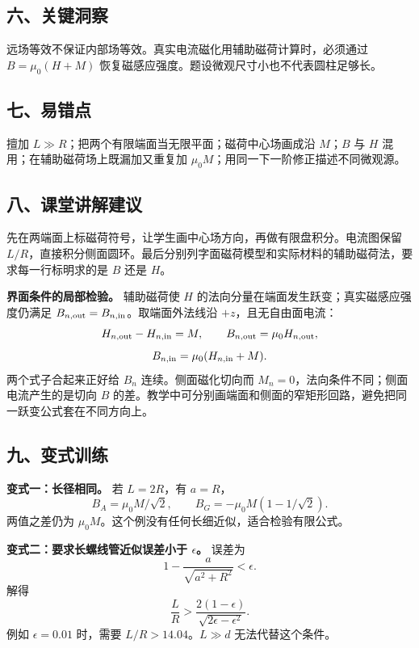 \documentclass[12pt,a4paper,UTF8]{ctexart}
\begin{document}
\subsection{六、关键洞察}\label{ux516dux5173ux952eux6d1eux5bdf-3}

远场等效不保证内部场等效。真实电流磁化用辅助磁荷计算时，必须通过
\(B=\mu_0(H+M)\) 恢复磁感应强度。题设微观尺寸小也不代表圆柱足够长。

\subsection{七、易错点}\label{ux4e03ux6613ux9519ux70b9-3}

擅加 \(L\gg R\)；把两个有限端面当无限平面；磁荷中心场画成沿 \(M\)；\(B\)
与 \(H\) 混用；在辅助磁荷场上既漏加又重复加
\(\mu_0M\)；用同一下一阶修正描述不同微观源。

\subsection{八、课堂讲解建议}\label{ux516bux8bfeux5802ux8bb2ux89e3ux5efaux8bae-3}

先在两端面上标磁荷符号，让学生画中心场方向，再做有限盘积分。电流图保留
\(L/R\)，直接积分侧面圆环。最后分别列字面磁荷模型和实际材料的辅助磁荷法，要求每一行标明求的是
\(B\) 还是 \(H\)。

\textbf{界面条件的局部检验。} 辅助磁荷使 \(H\)
的法向分量在端面发生跃变；真实磁感应强度仍满足
\(B_{n,\rm out}=B_{n,\rm in}\)。取端面外法线沿 \(+z\)，且无自由面电流：
\[
H_{n,\rm out}-H_{n,\rm in}=M,\qquad
B_{n,\rm out}=\mu_0H_{n,\rm out},
\] \[
B_{n,\rm in}=\mu_0(H_{n,\rm in}+M).
\] 两个式子合起来正好给 \(B_n\) 连续。侧面磁化切向而
\(M_n=0\)，法向条件不同；侧面电流产生的是切向 \(B\)
的差。教学中可分别画端面和侧面的窄矩形回路，避免把同一跃变公式套在不同方向上。

\subsection{九、变式训练}\label{ux4e5dux53d8ux5f0fux8badux7ec3-3}

\textbf{变式一：长径相同。} 若 \(L=2R\)，有 \(a=R\)， \[
B_A=\mu_0M/\sqrt2,\qquad
B_G=-\mu_0M(1-1/\sqrt2).
\] 两值之差仍为 \(\mu_0M\)。这个例没有任何长细近似，适合检验有限公式。

\textbf{变式二：要求长螺线管近似误差小于 \(\epsilon\)。} 误差为 \[
1-\frac a{\sqrt{a^2+R^2}}<\epsilon.
\] 解得 \[
\frac LR>
\frac{2(1-\epsilon)}{\sqrt{2\epsilon-\epsilon^2}}.
\] 例如 \(\epsilon=0.01\) 时，需要 \(L/R>14.04\)。\(L\gg d\)
无法代替这个条件。
\end{document}
